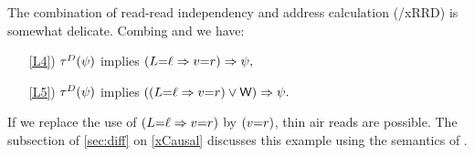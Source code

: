\begin{example}
  \label{ex:xADDRxRRD}
  The combination of read-read independency and address calculation
  (\xADDR/xRRD) is somewhat delicate.  Combing  and
   we have:
  \begin{enumerate}
    
  \item[\ref{L4})]
    $\aTr{\bEvs}{\bForm}$ implies
    \begin{math}
      (L{=}\ell\Rightarrow v{=}r)\Rightarrow\psi,
    \end{math}
  \item[\ref{L5})]
    $\aTr{\cEvs}{\bForm}$ implies
    \begin{math}
      ((L{=}\ell\Rightarrow v{=}r)\lor\mathsf{W})\Rightarrow\psi.
    \end{math}
  \end{enumerate}
  If we replace the use of $(L{=}\ell\Rightarrow v{=}r)$ by
  $(v{=}r)$, thin air reads are possible.  The subsection of
  \textsection\ref{sec:diff} on \ref{xCausal} discusses this example using
  the semantics of \jjr{}.
  

\end{example}
